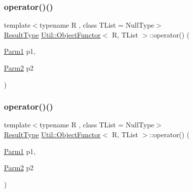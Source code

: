 \subsubsection{\texorpdfstring{operator()()}{operator()()}\hspace{0.1cm}{\footnotesize\ttfamily [8/18]}}
{\footnotesize\ttfamily template$<$typename R , class T\+List  = Null\+Type$>$ \\
\mbox{\hyperlink{classUtil_1_1ObjectFunctor_a77f816e98108848347d0dfc085090a1c}{Result\+Type}} \mbox{\hyperlink{classUtil_1_1ObjectFunctor}{Util\+::\+Object\+Functor}}$<$ R, T\+List $>$\+::operator() (\begin{DoxyParamCaption}\item[{\mbox{\hyperlink{classUtil_1_1ObjectFunctor_a199715d28029627c2ae7219c13b04d26}{Parm1}}}]{p1,  }\item[{\mbox{\hyperlink{classUtil_1_1ObjectFunctor_a6809cf65883dc7575e01d9b9849649cf}{Parm2}}}]{p2 }\end{DoxyParamCaption})\hspace{0.3cm}{\ttfamily [inline]}}

\mbox{\label{classUtil_1_1ObjectFunctor_a95148ad6414e7e28998227841c27be6c}} 
\subsubsection{\texorpdfstring{operator()()}{operator()()}\hspace{0.1cm}{\footnotesize\ttfamily [9/18]}}
{\footnotesize\ttfamily template$<$typename R , class T\+List  = Null\+Type$>$ \\
\mbox{\hyperlink{classUtil_1_1ObjectFunctor_a77f816e98108848347d0dfc085090a1c}{Result\+Type}} \mbox{\hyperlink{classUtil_1_1ObjectFunctor}{Util\+::\+Object\+Functor}}$<$ R, T\+List $>$\+::operator() (\begin{DoxyParamCaption}\item[{\mbox{\hyperlink{classUtil_1_1ObjectFunctor_a199715d28029627c2ae7219c13b04d26}{Parm1}}}]{p1,  }\item[{\mbox{\hyperlink{classUtil_1_1ObjectFunctor_a6809cf65883dc7575e01d9b9849649cf}{Parm2}}}]{p2 }\end{DoxyParamCaption})\hspace{0.3cm}{\ttfamily [inline]}}

